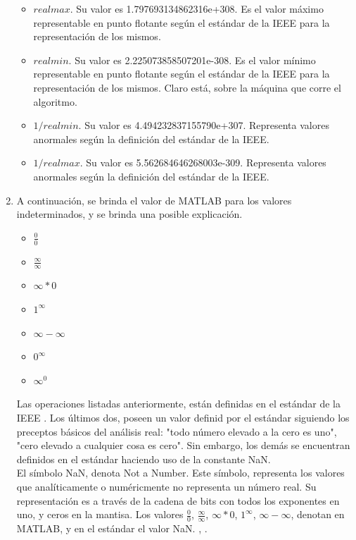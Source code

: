 \documentclass[11pt, spanish]{article}
\begin{document}
\begin{enumerate}
\begin{itemize}
\item $realmax$. Su valor es 1.797693134862316e+308. Es el valor máximo representable en punto flotante según el estándar de la IEEE para la representación de los mismos.
\item $realmin$. Su valor es 2.225073858507201e-308. Es el valor mínimo representable en punto flotante según el estándar de la IEEE para la representación de los mismos. Claro está, sobre la máquina que corre el algoritmo.
\item $1/realmin$. Su valor es 4.494232837155790e+307. Representa valores anormales según la definición del estándar de la IEEE.
\item $1/realmax$. Su valor es 5.562684646268003e-309. Representa valores anormales según la definición del estándar de la IEEE.
\end{itemize}

\item A continuación, se brinda el valor de \textsc{MATLAB} para los valores indeterminados, y se brinda una posible explicación.

\begin{itemize}
\item $\frac{0}{0}$
\item $\frac{\infty}{\infty}$
\item $\infty * 0$
\item $1^{\infty}$
\item $\infty - \infty$
\item $0^\infty$
\item $\infty ^0$
\end{itemize}

Las operaciones listadas anteriormente, están definidas en el estándar de la IEEE \cite{ieeestd}. Los últimos dos, poseen un valor definid por el estándar siguiendo los preceptos básicos del análisis real: "todo número elevado a la cero es uno", "cero elevado a cualquier cosa es cero". Sin embargo, los demás se encuentran definidos en el estándar  haciendo uso de la constante NaN.\\

El símbolo NaN, denota Not a Number. Este símbolo, representa los valores que analíticamente o numéricmente no representa un número real. Su representación es a través de la cadena de bits con todos los exponentes en uno, y ceros en la mantisa. Los valores  $\frac{0}{0}$, $\frac{\infty}{\infty}$, $\infty * 0$, $1^{\infty}$, $\infty - \infty$, denotan en \textsc{MATLAB}, y en el estándar el valor NaN. \cite{ieeestd}, \cite{stallins}.


\end{enumerate}
\end{document}
